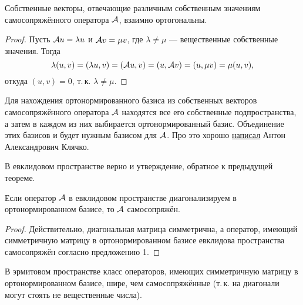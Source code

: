 \begin{lemma}
    Собственные векторы, отвечающие различным собственным значениям самосопряжённого оператора $\mathcal{A}$, взаимно ортогональны.
\end{lemma}

\begin{proof}
    Пусть $\mathcal{A} u = \lambda u$ и $\mathcal{A} v = \mu v$, где $\lambda \ne \mu$ --- вещественные собственные значения. Тогда
    \[
        \lambda(u, v) = (\lambda u, v) = (\mathcal{A} u, v) = (u, \mathcal{A} v) = (u, \mu v) = \mu(u, v),
    \]
    откуда $(u, v) = 0$, т.\,к. $\lambda \ne \mu$.
\end{proof}

Для нахождения ортонормированного базиса из собственных векторов самосопряжённого оператора $\mathcal{A}$ находятся все его собственные подпространства, а затем в каждом из них выбирается ортонормированный базис. Объединение этих базисов и будет нужным базисом для $\mathcal{A}$. Про это хорошо \href{http://halgebra.math.msu.su/staff/klyachko/teaching/lin.al/SY.PDF}{написал} Антон Александрович Клячко.

В евклидовом пространстве верно и утверждение, обратное к предыдущей теореме.

\begin{proposal}
    Если оператор $\mathcal{A}$ в евклидовом пространстве диагонализируем в ортонормированном базисе, то $\mathcal{A}$ самосопряжён.
\end{proposal}

\begin{proof}
    Действительно, диагональная матрица симметрична, а оператор, имеющий симметричную матрицу в ортонормированном базисе евклидова пространства самосопряжён согласно предложению 1.
\end{proof}

В эрмитовом пространстве класс операторов, имеющих симметричную матрицу в ортонормированном базисе, шире, чем самосопряжённые (т.\,к. на диагонали могут стоять не вещественные числа).

